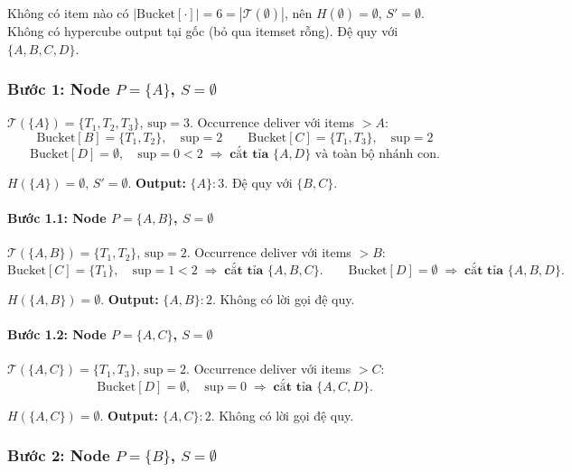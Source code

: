 \documentclass[12pt,a4paper]{article}
\theoremstyle{definition}
\begin{document}
Không có item nào có $|\text{Bucket}[\cdot]| = 6 = |\mathcal{T}(\emptyset)|$,
nên $H(\emptyset) = \emptyset$, $S' = \emptyset$.
Không có hypercube output tại gốc (bỏ qua itemset rỗng).
Đệ quy với $\{A, B, C, D\}$.

\subsubsection{Bước 1: Node $P=\{A\}$, $S=\emptyset$}

$\mathcal{T}(\{A\}) = \{T_1,T_2,T_3\}$, $\mathrm{sup}=3$.
Occurrence deliver với items $> A$:
\[
    \text{Bucket}[B] = \{T_1,T_2\},\quad \mathrm{sup}=2
    \qquad
    \text{Bucket}[C] = \{T_1,T_3\},\quad \mathrm{sup}=2
\]
\[
    \text{Bucket}[D] = \emptyset,\quad \mathrm{sup}=0 < 2
    \;\Rightarrow\; \textbf{cắt tỉa } \{A,D\}
    \text{ và toàn bộ nhánh con.}
\]

$H(\{A\}) = \emptyset$, $S' = \emptyset$.
\textbf{Output:} $\{A\}:3$.
Đệ quy với $\{B, C\}$.

\paragraph{Bước 1.1: Node $P=\{A,B\}$, $S=\emptyset$}

$\mathcal{T}(\{A,B\}) = \{T_1,T_2\}$, $\mathrm{sup}=2$.
Occurrence deliver với items $> B$:
\[
    \text{Bucket}[C] = \{T_1\},\quad \mathrm{sup}=1 < 2
    \;\Rightarrow\; \textbf{cắt tỉa } \{A,B,C\}.
    \qquad
    \text{Bucket}[D] = \emptyset
    \;\Rightarrow\; \textbf{cắt tỉa } \{A,B,D\}.
\]

$H(\{A,B\}) = \emptyset$. \textbf{Output:} $\{A,B\}:2$.
Không có lời gọi đệ quy.

\paragraph{Bước 1.2: Node $P=\{A,C\}$, $S=\emptyset$}

$\mathcal{T}(\{A,C\}) = \{T_1,T_3\}$, $\mathrm{sup}=2$.
Occurrence deliver với items $> C$:
\[
    \text{Bucket}[D] = \emptyset,\quad \mathrm{sup}=0
    \;\Rightarrow\; \textbf{cắt tỉa } \{A,C,D\}.
\]

$H(\{A,C\}) = \emptyset$. \textbf{Output:} $\{A,C\}:2$.
Không có lời gọi đệ quy.

\subsubsection{Bước 2: Node $P=\{B\}$, $S=\emptyset$}
\end{document}
